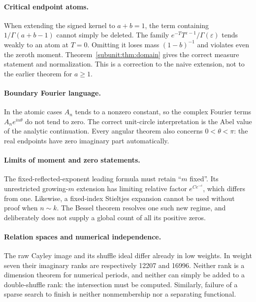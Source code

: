 \paragraph{Critical endpoint atoms.}
When extending the signed kernel to $a+b=1$, the term containing
$1/\Gamma(a+b-1)$ cannot simply be deleted. The family
$e^{-T}T^{\varepsilon-1}/\Gamma(\varepsilon)$ tends weakly to an
atom at $T=0$. Omitting it loses mass $(1-b)^{-1}$ and violates
even the zeroth moment. Theorem~\ref{subunit:thm:domain} gives the
correct measure statement and normalization. This is a correction to
the naive extension, not to the earlier theorem for $a\ge1$.

\paragraph{Boundary Fourier language.}
In the atomic cases $A_n$ tends to a nonzero constant, so the complex
Fourier terms $A_ne^{in\theta}$ do not tend to zero. The correct
unit-circle interpretation is the Abel value of the analytic
continuation. Every angular theorem also concerns $0<\theta<\pi$:
the real endpoints have zero imaginary part automatically.

\paragraph{Limits of moment and zero statements.}
The fixed-reflected-exponent leading formula must retain ``$m$ fixed''.
Its unrestricted growing-$m$ extension has limiting relative factor
$e^{Ce^{-c}}$, which differs from one. Likewise, a fixed-index
Stieltjes expansion cannot be used without proof when $n\sim k$.
The Bessel theorem resolves one such new regime, and deliberately
does not supply a global count of all its positive zeros.

\paragraph{Relation spaces and numerical independence.}
The raw Cayley image and its shuffle ideal differ already in low
weights. In weight seven their imaginary ranks are respectively
12207 and 16996. Neither rank is a dimension theorem for numerical
periods, and neither can simply be added to a double-shuffle rank:
the intersection must be computed. Similarly, failure of a sparse
search to finish is neither nonmembership nor a separating functional.

